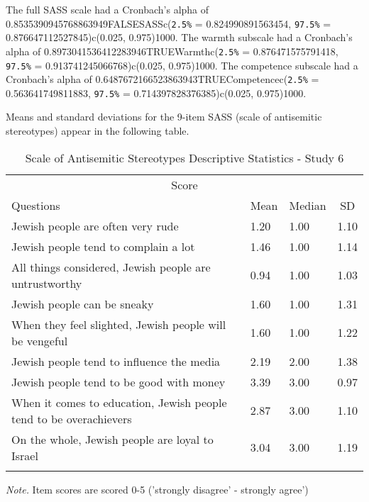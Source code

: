 \documentclass[
  doc,draftall]{apa6}
\begin{document}
The full SASS scale had a Cronbach's alpha of 0.8535390945768863949FALSESASSc(\texttt{2.5\%} = 0.824990891563454, \texttt{97.5\%} = 0.876647112527845)c(0.025, 0.975)1000.
The warmth subscale had a Cronbach's alpha of 0.8973041536412283946TRUEWarmthc(\texttt{2.5\%} = 0.876471575791418, \texttt{97.5\%} = 0.913741245066768)c(0.025, 0.975)1000.
The competence subscale had a Cronbach's alpha of 0.6487672166523863943TRUECompetencec(\texttt{2.5\%} = 0.563641749811883, \texttt{97.5\%} = 0.714397828376385)c(0.025, 0.975)1000.

Means and standard deviations for the 9-item SASS (scale of antisemitic stereotypes) appear in the following table.

\begin{table}[tbp]

\begin{center}
\begin{threeparttable}

\caption{\label{tab:unnamed-chunk-4}Scale of Antisemitic Stereotypes Descriptive Statistics - Study 6}

\begin{tabular}{llll}
\toprule
 \multicolumn{4}{c}{Score} \\
\cmidrule(r){1-4}
Questions & \multicolumn{1}{c}{Mean} & \multicolumn{1}{c}{Median} & \multicolumn{1}{c}{SD}\\
\midrule
Jewish people are often very rude & 1.20 & 1.00 & 1.10\\
Jewish people tend to complain a lot & 1.46 & 1.00 & 1.14\\
All things considered, Jewish people are untrustworthy & 0.94 & 1.00 & 1.03\\
Jewish people can be sneaky & 1.60 & 1.00 & 1.31\\
When they feel slighted, Jewish people will be vengeful & 1.60 & 1.00 & 1.22\\
Jewish people tend to influence the media & 2.19 & 2.00 & 1.38\\
Jewish people tend to be good with money & 3.39 & 3.00 & 0.97\\
When it comes to education, Jewish people tend to be overachievers & 2.87 & 3.00 & 1.10\\
On the whole, Jewish people are loyal to Israel & 3.04 & 3.00 & 1.19\\
\bottomrule
\addlinespace
\end{tabular}

\begin{tablenotes}[para]
\normalsize{\textit{Note.} Item scores are scored 0-5 ('strongly disagree' - strongly agree')}
\end{tablenotes}

\end{threeparttable}
\end{center}

\end{table}
\end{document}
